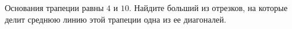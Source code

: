 \begin{ex}
	\begin{condition}
		Основания трапеции равны \( 4  \) и \( 10 \). Найдите больший из отрезков, на которые делит среднюю линию этой трапеции одна из ее диагоналей.
	\end{condition}
\end{ex}